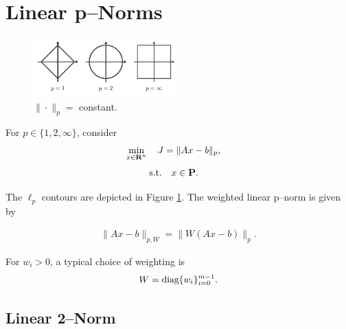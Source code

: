 \documentclass{article}
\begin{document}
\clearpage

\section{Linear p--Norms}
    \begin{figure}[h!]
        \centering
        \includegraphics[width=0.5\textwidth]{./figs/norm/lp.png}
        \caption{$\|\cdot\|_p = $ constant.}
        \label{fig:lp}
    \end{figure}
    For $p\in\{1,2,\infty\}$, consider 
    \begin{align*}
            \min_{x\in\textbf{R}^n}
        \quad
            J
        &=
            \|A x - b \|_p,
    \end{align*}
    \begin{align*}
        \text{s.t.}\quad&x\in\textbf{P}.
    \end{align*}

    The $\ell_p$ contours are depicted in Figure \ref{fig:lp}.
    The weighted linear p--norm is given by

    \begin{align*}
        \|Ax-b\|_{p,W}=\|W(Ax-b)\|_p.
    \end{align*}

    For $w_i>0$, a typical choice of weighting is
    \begin{align*}
        W=\text{diag}\{w_i\}_{i=0}^{m-1}.
    \end{align*}

\subsection{Linear 2--Norm}
\end{document}
